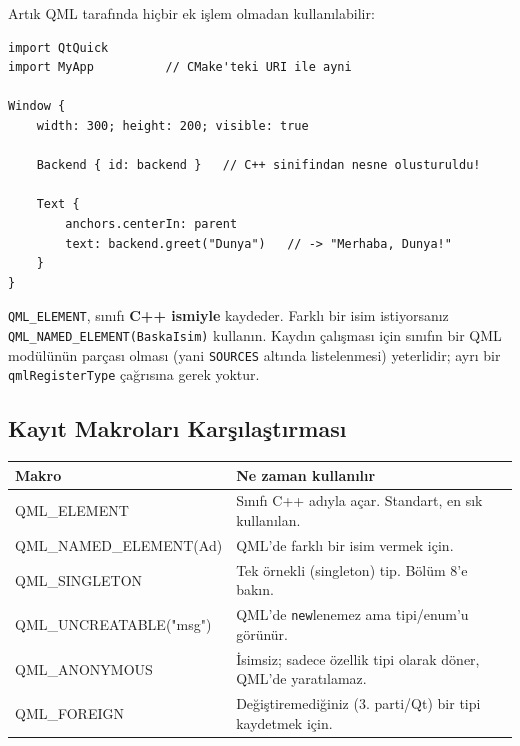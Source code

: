 \documentclass[11pt,a4paper]{article}
\newcommand{\kod}[1]{\texttt{\color{koyuGri}#1}}
\begin{document}
Artık QML tarafında hiçbir ek işlem olmadan kullanılabilir:

\begin{lstlisting}[style=qmlstyle]
import QtQuick
import MyApp          // CMake'teki URI ile ayni

Window {
    width: 300; height: 200; visible: true

    Backend { id: backend }   // C++ sinifindan nesne olusturuldu!

    Text {
        anchors.centerIn: parent
        text: backend.greet("Dunya")   // -> "Merhaba, Dunya!"
    }
}
\end{lstlisting}

\begin{bilgikutu}
\kod{QML\_ELEMENT}, sınıfı \textbf{C++ ismiyle} kaydeder. Farklı bir isim
istiyorsanız \kod{QML\_NAMED\_ELEMENT(BaskaIsim)} kullanın. Kaydın çalışması için
sınıfın bir QML modülünün parçası olması (yani \kod{SOURCES} altında listelenmesi)
yeterlidir; ayrı bir \kod{qmlRegisterType} çağrısına gerek yoktur.
\end{bilgikutu}

\subsection{Kayıt Makroları Karşılaştırması}

\begin{center}
\begin{tabularx}{\textwidth}{@{}>{\ttfamily\color{anaMavi}\small}l >{\raggedright\arraybackslash}X@{}}
\toprule
\rowcolor{acikMavi}\color{anaMavi}\textbf{Makro} & \color{anaMavi}\textbf{Ne zaman kullanılır} \\
\midrule
QML\_ELEMENT & Sınıfı C++ adıyla açar. Standart, en sık kullanılan. \\
\rowcolor{acikGri} QML\_NAMED\_ELEMENT(Ad) & QML'de farklı bir isim vermek için. \\
QML\_SINGLETON & Tek örnekli (singleton) tip. Bölüm 8'e bakın. \\
\rowcolor{acikGri} QML\_UNCREATABLE("msg") & QML'de \kod{new}lenemez ama tipi/enum'u görünür. \\
QML\_ANONYMOUS & İsimsiz; sadece özellik tipi olarak döner, QML'de yaratılamaz. \\
\rowcolor{acikGri} QML\_FOREIGN & Değiştiremediğiniz (3. parti/Qt) bir tipi kaydetmek için. \\
\bottomrule
\end{tabularx}
\end{center}
\end{document}
